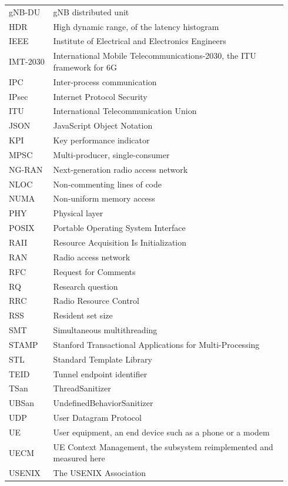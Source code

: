 \documentclass[english,oneside,a4paper,censored,csm,software-track-2020]{HYthesisML}
\begin{document}
\begin{longtable}{@{}p{0.15\linewidth} p{0.79\linewidth}@{}}
gNB-DU & gNB distributed unit \\
HDR & High dynamic range, of the latency histogram \\
IEEE & Institute of Electrical and Electronics Engineers \\
IMT-2030 & International Mobile Telecommunications-2030, the ITU framework for 6G \\
IPC & Inter-process communication \\
IPsec & Internet Protocol Security \\
ITU & International Telecommunication Union \\
JSON & JavaScript Object Notation \\
KPI & Key performance indicator \\
MPSC & Multi-producer, single-consumer \\
NG-RAN & Next-generation radio access network \\
NLOC & Non-commenting lines of code \\
NUMA & Non-uniform memory access \\
PHY & Physical layer \\
POSIX & Portable Operating System Interface \\
RAII & Resource Acquisition Is Initialization \\
RAN & Radio access network \\
RFC & Request for Comments \\
RQ & Research question \\
RRC & Radio Resource Control \\
RSS & Resident set size \\
SMT & Simultaneous multithreading \\
STAMP & Stanford Transactional Applications for Multi-Processing \\
STL & Standard Template Library \\
TEID & Tunnel endpoint identifier \\
TSan & ThreadSanitizer \\
UBSan & UndefinedBehaviorSanitizer \\
UDP & User Datagram Protocol \\
UE & User equipment, an end device such as a phone or a modem \\
UECM & UE Context Management, the subsystem reimplemented and measured here \\
USENIX & The USENIX Association \\
\hline
\end{longtable}
\endgroup
\end{document}
